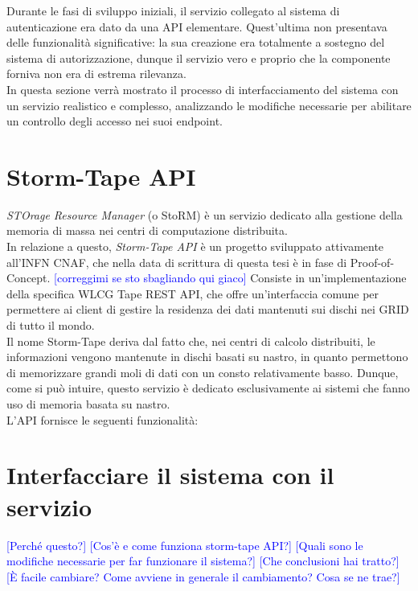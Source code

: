 Durante le fasi di sviluppo iniziali, il servizio collegato al sistema di autenticazione era dato da una API
elementare. Quest'ultima non presentava delle funzionalità significative: la sua creazione era totalmente 
a sostegno del sistema di autorizzazione, dunque il servizio vero e proprio che la componente forniva non era 
di estrema rilevanza.  
\\ In questa sezione verrà mostrato il processo di interfacciamento del sistema con un servizio 
realistico e complesso, analizzando le modifiche necessarie per abilitare un controllo degli accesso
nei suoi endpoint. 
\section{Storm-Tape API}
\textit{STOrage Resource Manager} (o StoRM) è un servizio dedicato alla gestione della memoria 
di massa nei centri di computazione distribuita. \\ In relazione a questo, \textit{Storm-Tape API} è un progetto sviluppato
 attivamente all'INFN CNAF, che nella data di scrittura di questa tesi è in fase di Proof-of-Concept.
 \textcolor{blue}{[correggimi se sto sbagliando qui giaco]}
Consiste in un'implementazione della specifica {WLCG Tape REST API}, che offre un'interfaccia comune per permettere 
ai client di gestire la residenza dei dati mantenuti sui dischi nei GRID di tutto il mondo. 
\\ Il nome Storm-Tape deriva dal fatto che, nei centri di calcolo distribuiti,
 le informazioni vengono mantenute in dischi basati su nastro, in quanto permettono di memorizzare 
grandi moli di dati con un consto relativamente basso. Dunque, come si può intuire, questo servizio è dedicato esclusivamente 
ai sistemi che fanno uso di memoria basata su nastro. \\ 
L'API fornisce le seguenti funzionalità:


\section{Interfacciare il sistema con il servizio}


\textcolor{blue}{[Perché questo?]}
\textcolor{blue}{[Cos'è e come funziona storm-tape API?]}
\textcolor{blue}{[Quali sono le modifiche necessarie per far funzionare il sistema?]}
\textcolor{blue}{[Che conclusioni hai tratto?]}
\textcolor{blue}{[È facile cambiare? Come avviene in generale il cambiamento? Cosa se ne trae?]}

